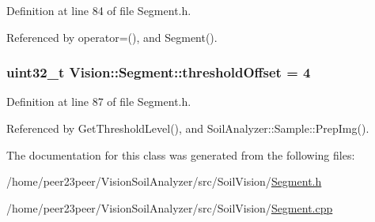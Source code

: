 Definition at line 84 of file Segment.\+h.



Referenced by operator=(), and Segment().

\hypertarget{class_vision_1_1_segment_a1338fc42ead26c6b1dd661f4281f5674}{}
\subsubsection[{threshold\+Offset}]{\setlength{\rightskip}{0pt plus 5cm}uint32\+\_\+t Vision\+::\+Segment\+::threshold\+Offset = 4}\label{class_vision_1_1_segment_a1338fc42ead26c6b1dd661f4281f5674}


Definition at line 87 of file Segment.\+h.



Referenced by Get\+Threshold\+Level(), and Soil\+Analyzer\+::\+Sample\+::\+Prep\+Img().



The documentation for this class was generated from the following files\+:\begin{DoxyCompactItemize}
\item 
/home/peer23peer/\+Vision\+Soil\+Analyzer/src/\+Soil\+Vision/\hyperlink{_segment_8h}{Segment.\+h}\item 
/home/peer23peer/\+Vision\+Soil\+Analyzer/src/\+Soil\+Vision/\hyperlink{_segment_8cpp}{Segment.\+cpp}\end{DoxyCompactItemize}
